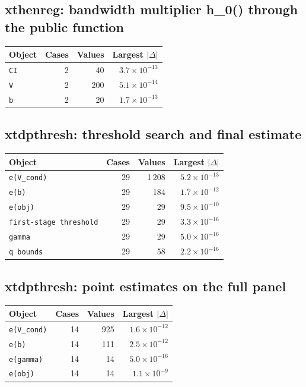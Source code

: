 \documentclass[10.5pt,a4paper]{article}
\begin{document}
\subsection*{xthenreg: bandwidth multiplier h\_0() through the public function}

\begin{longtable}{@{}p{8.2cm}rrr@{}}
\toprule
Object & Cases & Values & Largest $|\Delta|$ \\
\midrule
\endhead
\texttt{CI} & 2 & 40 & $3.7\times10^{-13}$ \\
\texttt{V} & 2 & 200 & $5.1\times10^{-14}$ \\
\texttt{b} & 2 & 20 & $1.7\times10^{-13}$ \\
\bottomrule
\end{longtable}

\subsection*{xtdpthresh: threshold search and final estimate}

\begin{longtable}{@{}p{8.2cm}rrr@{}}
\toprule
Object & Cases & Values & Largest $|\Delta|$ \\
\midrule
\endhead
\texttt{e(V\_\allowbreak{}cond)} & 29 & 1\,208 & $5.2\times10^{-13}$ \\
\texttt{e(b)} & 29 & 184 & $1.7\times10^{-12}$ \\
\texttt{e(obj)} & 29 & 29 & $9.5\times10^{-10}$ \\
\texttt{first-stage threshold} & 29 & 29 & $3.3\times10^{-16}$ \\
\texttt{gamma} & 29 & 29 & $5.0\times10^{-16}$ \\
\texttt{q bounds} & 29 & 58 & $2.2\times10^{-16}$ \\
\bottomrule
\end{longtable}

\subsection*{xtdpthresh: point estimates on the full panel}

\begin{longtable}{@{}p{8.2cm}rrr@{}}
\toprule
Object & Cases & Values & Largest $|\Delta|$ \\
\midrule
\endhead
\texttt{e(V\_\allowbreak{}cond)} & 14 & 925 & $1.6\times10^{-12}$ \\
\texttt{e(b)} & 14 & 111 & $2.5\times10^{-12}$ \\
\texttt{e(gamma)} & 14 & 14 & $5.0\times10^{-16}$ \\
\texttt{e(obj)} & 14 & 14 & $1.1\times10^{-9}$ \\
\bottomrule
\end{longtable}
\end{document}
